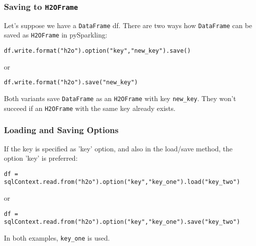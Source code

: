 \subsubsection{Saving to \texttt{H2OFrame}}

Let's suppose we have a \texttt{DataFrame} df. There are two ways how \texttt{DataFrame} can be saved as 
\texttt{H2OFrame} in pySparkling:

\begin{lstlisting}[style=Scala]
df.write.format("h2o").option("key","new_key").save()
\end{lstlisting}
or
\begin{lstlisting}[style=Scala]
df.write.format("h2o").save("new_key")
\end{lstlisting}

Both variants save \texttt{DataFrame} as an \texttt{H2OFrame} with key \texttt{new\_key}. They won't succeed if an \texttt{H2OFrame} with the same key already exists.

\subsubsection{Loading and Saving Options}

If the key is specified as 'key' option, and also in the load/save method, the option 'key' is preferred:
\begin{lstlisting}[style=Scala]
df = sqlContext.read.from("h2o").option("key","key_one").load("key_two")
\end{lstlisting}
or
\begin{lstlisting}[style=Scala]
df = sqlContext.read.from("h2o").option("key","key_one").save("key_two")
\end{lstlisting}

In both examples, \texttt{key\_one} is used.

